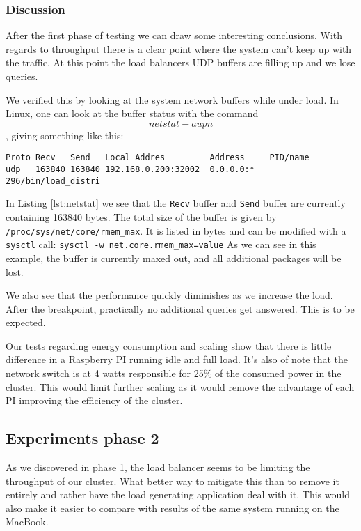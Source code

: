 \subsubsection{Discussion}
After the first phase of testing we can draw some interesting conclusions. With regards to throughput there is a clear point where the system can't keep up with the traffic. At this point the load balancers UDP buffers are filling up and we lose queries.

We verified this by looking at the system network buffers while under load. In Linux, one can look at the buffer status with the command $$netstat -aupn$$, giving something like this:
\begin{lstlisting}[caption={Output of {\tt netstat -aupn | grep 32002}},captionpos=b,label={lst:netstat}]
Proto Recv   Send   Local Addres         Address     PID/name
udp   163840 163840 192.168.0.200:32002  0.0.0.0:*   296/bin/load_distri
\end{lstlisting}
In Listing \ref{lst:netstat} we see that the {\tt Recv} buffer and {\tt Send} buffer are currently containing 163840 bytes.
The total size of the buffer is given by {\tt /proc/sys/net/core/rmem\_max}. It is listed in bytes and can be modified with a {\tt sysctl} call: {\tt sysctl -w net.core.rmem_max=value}
As we can see in this example, the buffer is currently maxed out, and all additional packages will be lost.

We also see that the performance quickly diminishes as we increase the load. After the breakpoint, practically no additional queries get answered.
This is to be expected.

Our tests regarding energy consumption and scaling show that there is little difference in a Raspberry PI running idle and full load. It's also of note that the network switch is at 4 watts responsible for 25\% of the consumed power in the cluster. This would limit further scaling as it would remove the advantage of each PI improving the efficiency of the cluster.

\subsection{Experiments phase 2}
As we discovered in phase 1, the load balancer seems to be limiting the throughput of our cluster. What better way to mitigate this than to remove it entirely and rather have the load generating application deal with it. This would also make it easier to compare with results of the same system running on the MacBook.

